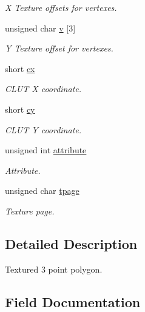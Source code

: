\begin{DoxyCompactItemize}
\begin{DoxyCompactList}\small\item\em X Texture offsets for vertexes. \end{DoxyCompactList}\item 
unsigned char \hyperlink{structGsTPoly3_a0542f91621ad1a3ad58c57529edbc9ae}{v} \mbox{[}3\mbox{]}
\begin{DoxyCompactList}\small\item\em Y Texture offset for vertexes. \end{DoxyCompactList}\item 
short \hyperlink{structGsTPoly3_a43b86f46391cd471dc92a9dec1a3b46f}{cx}
\begin{DoxyCompactList}\small\item\em C\+L\+UT X coordinate. \end{DoxyCompactList}\item 
short \hyperlink{structGsTPoly3_a825c6c03d56ff019f7845f06222d096a}{cy}
\begin{DoxyCompactList}\small\item\em C\+L\+UT Y coordinate. \end{DoxyCompactList}\item 
unsigned int \hyperlink{structGsTPoly3_a4f85d7de528311b6354979fdcef9b25e}{attribute}
\begin{DoxyCompactList}\small\item\em Attribute. \end{DoxyCompactList}\item 
unsigned char \hyperlink{structGsTPoly3_a12e862df67b142de177d776c29272e67}{tpage}
\begin{DoxyCompactList}\small\item\em Texture page. \end{DoxyCompactList}\end{DoxyCompactItemize}


\subsection{Detailed Description}
Textured 3 point polygon. 

\subsection{Field Documentation}
\mbox{\label{structGsTPoly3_a4f85d7de528311b6354979fdcef9b25e}} 
